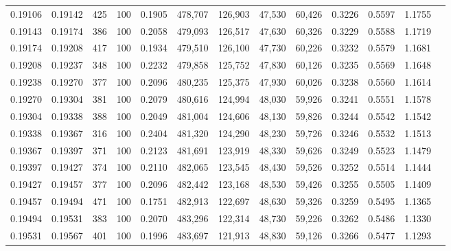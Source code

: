 \begin{tabular}{rrrrrrrrrrrrr}
0.19106 & 0.19142 &   425 & 100 &                                     0.1905 & 478,707 & 126,903 &  47,530 &  60,426 & 0.3226 & 0.5597 & 1.1755 \\
0.19143 & 0.19174 &   386 & 100 &                                     0.2058 & 479,093 & 126,517 &  47,630 &  60,326 & 0.3229 & 0.5588 & 1.1719 \\
0.19174 & 0.19208 &   417 & 100 &                                     0.1934 & 479,510 & 126,100 &  47,730 &  60,226 & 0.3232 & 0.5579 & 1.1681 \\
0.19208 & 0.19237 &   348 & 100 &                                     0.2232 & 479,858 & 125,752 &  47,830 &  60,126 & 0.3235 & 0.5569 & 1.1648 \\
0.19238 & 0.19270 &   377 & 100 &                                     0.2096 & 480,235 & 125,375 &  47,930 &  60,026 & 0.3238 & 0.5560 & 1.1614 \\
0.19270 & 0.19304 &   381 & 100 &                                     0.2079 & 480,616 & 124,994 &  48,030 &  59,926 & 0.3241 & 0.5551 & 1.1578 \\
0.19304 & 0.19338 &   388 & 100 &                                     0.2049 & 481,004 & 124,606 &  48,130 &  59,826 & 0.3244 & 0.5542 & 1.1542 \\
0.19338 & 0.19367 &   316 & 100 &                                     0.2404 & 481,320 & 124,290 &  48,230 &  59,726 & 0.3246 & 0.5532 & 1.1513 \\
0.19367 & 0.19397 &   371 & 100 &                                     0.2123 & 481,691 & 123,919 &  48,330 &  59,626 & 0.3249 & 0.5523 & 1.1479 \\
0.19397 & 0.19427 &   374 & 100 &                                     0.2110 & 482,065 & 123,545 &  48,430 &  59,526 & 0.3252 & 0.5514 & 1.1444 \\
0.19427 & 0.19457 &   377 & 100 &                                     0.2096 & 482,442 & 123,168 &  48,530 &  59,426 & 0.3255 & 0.5505 & 1.1409 \\
0.19457 & 0.19494 &   471 & 100 &                                     0.1751 & 482,913 & 122,697 &  48,630 &  59,326 & 0.3259 & 0.5495 & 1.1365 \\
0.19494 & 0.19531 &   383 & 100 &                                     0.2070 & 483,296 & 122,314 &  48,730 &  59,226 & 0.3262 & 0.5486 & 1.1330 \\
0.19531 & 0.19567 &   401 & 100 &                                     0.1996 & 483,697 & 121,913 &  48,830 &  59,126 & 0.3266 & 0.5477 & 1.1293 \\

\end{tabular}
